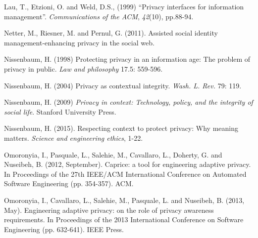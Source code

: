 \documentclass[../thesis.tex]{subfiles}
\begin{document}
\bigskip

\textcolor[rgb]{0.13333334,0.13333334,0.13333334}{Lau, T., Etzioni, O.
and Weld, D.S., (1999) ``Privacy interfaces for
information management''.
}\textit{\textcolor[rgb]{0.13333334,0.13333334,0.13333334}{Communications
of the ACM}}\textcolor[rgb]{0.13333334,0.13333334,0.13333334}{,
}\textit{\textcolor[rgb]{0.13333334,0.13333334,0.13333334}{42}}\textcolor[rgb]{0.13333334,0.13333334,0.13333334}{(10),
pp.88-94.}

Netter, M., Riesner, M. and Pernul, G. (2011). Assisted social identity
management-enhancing privacy in the social web.


\bigskip

\textcolor[rgb]{0.13333334,0.13333334,0.13333334}{Nissenbaum, H. (1998)
{\textquotedbl}Protecting privacy in an information age: The problem of
privacy in public.{\textquotedbl}
}\textit{\textcolor[rgb]{0.13333334,0.13333334,0.13333334}{Law and
philosophy}}\textcolor[rgb]{0.13333334,0.13333334,0.13333334}{ 17.5:
559-596.}

\textcolor[rgb]{0.13333334,0.13333334,0.13333334}{Nissenbaum, H. (2004)
{\textquotedbl}Privacy as contextual integrity.{\textquotedbl}
}\textit{\textcolor[rgb]{0.13333334,0.13333334,0.13333334}{Wash. L.
Rev.}}\textcolor[rgb]{0.13333334,0.13333334,0.13333334}{ 79: 119.}


\bigskip

\textcolor[rgb]{0.13333334,0.13333334,0.13333334}{Nissenbaum, H. (2009)
}\textit{\textcolor[rgb]{0.13333334,0.13333334,0.13333334}{Privacy in
context: Technology, policy, and the integrity of social
life}}\textcolor[rgb]{0.13333334,0.13333334,0.13333334}{. Stanford
University Press.}


\bigskip

Nissenbaum, H. (2015). Respecting context to protect privacy: Why
meaning matters. \textit{Science and engineering ethics}, 1-22.


\bigskip

Omoronyia, I., Pasquale, L., Salehie, M., Cavallaro, L., Doherty, G. and
Nuseibeh, B. (2012, September). Caprice: a tool for engineering
adaptive privacy. In Proceedings of the 27th IEEE/ACM International
Conference on Automated Software Engineering (pp. 354-357). ACM.


\bigskip

Omoronyia, I., Cavallaro, L., Salehie, M., Pasquale, L. and Nuseibeh, B.
(2013, May). Engineering adaptive privacy: on the role of privacy
awareness requirements. In Proceedings of the 2013 International
Conference on Software Engineering (pp. 632-641). IEEE Press.
\end{document}
